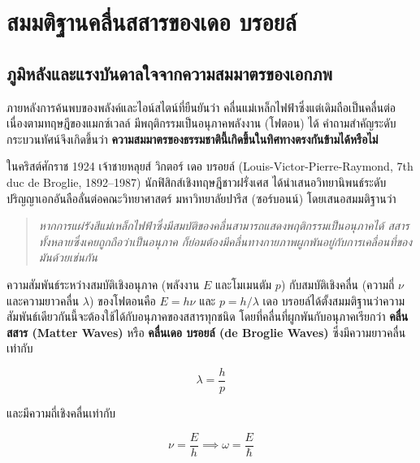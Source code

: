 \newpage
\section{สมมติฐานคลื่นสสารของเดอ บรอยล์}

\subsection{ภูมิหลังและแรงบันดาลใจจากความสมมาตรของเอกภพ}

ภายหลังการค้นพบของพลังค์และไอน์สไตน์ที่ยืนยันว่า คลื่นแม่เหล็กไฟฟ้าซึ่งแต่เดิมถือเป็นคลื่นต่อเนื่องตามทฤษฎีของแมกซ์เวลล์ มีพฤติกรรมเป็นอนุภาคพลังงาน (โฟตอน) ได้ คำถามสำคัญระดับกระบวนทัศน์จึงเกิดขึ้นว่า \textbf{ความสมมาตรของธรรมชาตินี้เกิดขึ้นในทิศทางตรงกันข้ามได้หรือไม่}

ในคริสต์ศักราช 1924 เจ้าชายหลุยส์ วิกตอร์ เดอ บรอยล์ (Louis-Victor-Pierre-Raymond, 7th duc de Broglie, 1892--1987) นักฟิสิกส์เชิงทฤษฎีชาวฝรั่งเศส ได้นำเสนอวิทยานิพนธ์ระดับปริญญาเอกอันลือลั่นต่อคณะวิทยาศาสตร์ มหาวิทยาลัยปารีส (ซอร์บอนน์) โดยเสนอสมมติฐานว่า

\begin{quote}
\textit{หากการแผ่รังสีแม่เหล็กไฟฟ้าซึ่งมีสมบัติของคลื่นสามารถแสดงพฤติกรรมเป็นอนุภาคได้ สสารทั้งหลายซึ่งเคยถูกถือว่าเป็นอนุภาค ก็ย่อมต้องมีคลื่นทางกายภาพผูกพันอยู่กับการเคลื่อนที่ของมันด้วยเช่นกัน}
\end{quote}

ความสัมพันธ์ระหว่างสมบัติเชิงอนุภาค (พลังงาน $E$ และโมเมนตัม $p$) กับสมบัติเชิงคลื่น (ความถี่ $\nu$ และความยาวคลื่น $\lambda$) ของโฟตอนคือ $E = h\nu$ และ $p = h/\lambda$ เดอ บรอยล์ได้ตั้งสมมติฐานว่าความสัมพันธ์เดียวกันนี้จะต้องใช้ได้กับอนุภาคของสสารทุกชนิด โดยที่คลื่นที่ผูกพันกับอนุภาคเรียกว่า \textbf{คลื่นสสาร (Matter Waves)} หรือ \textbf{คลื่นเดอ บรอยล์ (de Broglie Waves)} ซึ่งมีความยาวคลื่นเท่ากับ

\begin{equation}
\lambda = \frac{h}{p}
\label{eq:de_broglie_fundamental}
\end{equation}

และมีความถี่เชิงคลื่นเท่ากับ

\begin{equation}
\nu = \frac{E}{h} \implies \omega = \frac{E}{\hbar}
\label{eq:de_broglie_frequency}
\end{equation}


